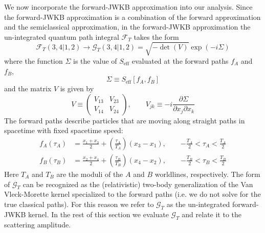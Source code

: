 We now incorporate the forward-JWKB approximation into our analysis. Since the forward-JWKB approximation is a combination of the forward approximation and the semiclassical approximation, in the forward-JWKB approximation the un-integrated quantum path integral $\mathcal{F}_{T}$ takes the form%
\begin{equation}
	\mathcal{F}_{T}(3, 4|1, 2) \longrightarrow \mathcal{G}_{T}(3, 4|1, 2) = \sqrt{-\det{(V)}} \exp{\left( -i \Sigma \right)}
\end{equation}
where the function $\Sigma$ is the value of $S_{\text{eff}}$ evaluated at the forward paths $f_{A}$ and $f_{B}$,
\begin{equation}
	\Sigma \equiv S_{\text{eff}} [f_{A}, f_{B}]
\end{equation}
and the matrix $V$ is given by
\begin{equation}
	V \equiv \begin{pmatrix}
	V_{1 3} & V_{2 3} \\
	V_{1 4} & V_{2 4}
	\end{pmatrix}, \qquad V_{jk} \equiv - i \frac{\partial \Sigma}{\partial x_{j} \partial x_{k}}
\end{equation}
The forward paths describe particles that are moving along straight paths in spacetime with fixed spacetime speed:
\begin{equation}
\begin{split}
	f_{A}(\tau_{A}) &= \frac{x_{1} + x_{3}}{2} + \left( \frac{\tau_{A}}{T_{A}} \right) \left(x_{3} - x_{1} \right), \qquad { - \frac{T_{A}}{2} } < \tau_{A} < \frac{T_{A}}{2} \\
	f_{B}(\tau_{B}) &= \frac{x_{2} + x_{4}}{2} + \left( \frac{\tau_{B}}{T_{B}} \right) \left(x_{4} - x_{2} \right), \qquad { - \frac{T_{B}}{2} } < \tau_{B} < \frac{T_{B}}{2}
\end{split} \label{fpaths}
\end{equation}
Here $T_{A}$ and $T_{B}$ are the moduli of the $A$ and $B$ worldlines, respectively. The form of $\mathcal{G}_{T}$ can be recognized as the (relativistic) two-body generalization of the Van Vleck-Morette kernel \cite{VanVleck,CartierMorette} specialized to the forward paths (i.e. we do not solve for the true classical paths). For this reason we refer to $\mathcal{G}_{T}$ as the un-integrated forward-JWKB kernel. In the rest of this section we evaluate $\mathcal{G}_{T}$ and relate it to the scattering amplitude.
